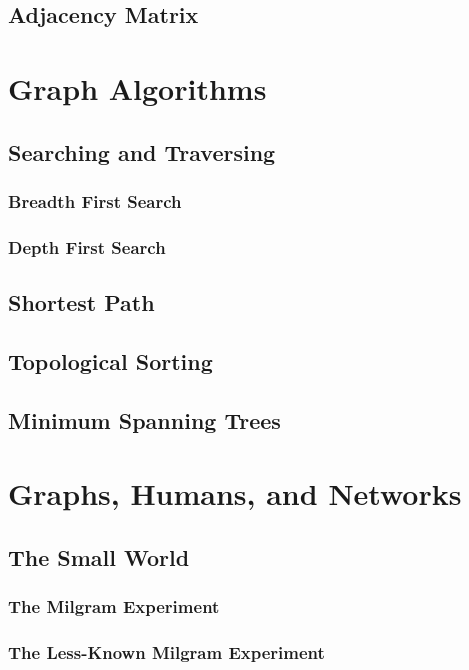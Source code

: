 \documentclass[10pt,a4paper]{book}
\begin{document}
\subsection{Adjacency Matrix}


\section{Graph Algorithms}

\subsection{Searching and Traversing}

\subsubsection{Breadth First Search}

\subsubsection{Depth First Search}


\subsection{Shortest Path}
\subsection{Topological Sorting}
\subsection{Minimum Spanning Trees}


\section{Graphs, Humans, and Networks}

\subsection{The Small World}
\subsubsection{The Milgram Experiment}
\subsubsection{The Less-Known Milgram Experiment}
\end{document}
